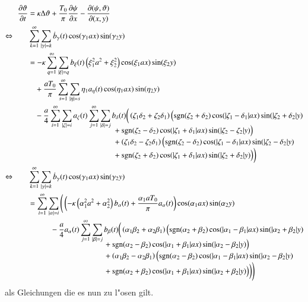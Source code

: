 \begin{align*}
\frac{\partial\vartheta}{\partial t}
&=
\kappa\Delta\vartheta
+ \frac{T_0}{\pi}\frac{\partial\psi}{\partial x}
- \frac{\partial(\psi,\vartheta)}{\partial(x,y)}
\\
\Leftrightarrow \qquad
&
\sum_{k = 1}^{\infty}
\sum_{|\gamma| = k}
\dot{b}_{\gamma}(t)
\cos(\gamma_1 ax) \sin(\gamma_2 y)
\\
&=
-
\kappa
\sum_{q = 1}^{\infty}
\sum_{|\xi| = q}
b_{\xi}(t)
\left(\xi_1^2 a^2 + \xi_2^2\right)
\cos(\xi_1 ax) \sin(\xi_2 y)
\\
&\phantom{={}}
+
\frac{a T_0}{\pi}
\sum_{s = 1}^{\infty}
\sum_{|\eta| = s}
\eta_1
a_{\eta}(t)
\cos(\eta_1 ax) \sin(\eta_2 y)
\\
&\phantom{={}}
-
\frac{a}{4}
\sum_{i = 1}^{\infty}
\sum_{|\zeta| = i}
a_{\zeta}(t)
\sum_{j = 1}^{\infty}
\sum_{|\delta| = j}
b_{\delta}(t)
\bigg(
\left(\zeta_1 \delta_2 + \zeta_2 \delta_1 \right)
\Big(
\sgn(\zeta_2 + \delta_2)
\cos(|\zeta_1 - \delta_1|ax)\sin(|\zeta_2 + \delta_2|y)
\\[-2ex]
&\phantom{=-abbb\sum\sum.....{}ccccccc}
+
\sgn(\zeta_2 - \delta_2)
\cos(|\zeta_1 + \delta_1|ax)\sin(|\zeta_2 - \zeta_2|y)
\Big)
\\[-1ex]
&\phantom{=-abbb\sum\sum.....{}ccccccc}
+
\left(\zeta_1 \delta_2 - \zeta_2 \delta_1 \right)
\Big(
\sgn(\zeta_2 - \delta_2)
\cos(|\zeta_1 - \delta_1|ax)\sin(|\zeta_2 - \delta_2|y)
\\[-1ex]
&\phantom{=-abbb\sum\sum.....{}ccccccc}
+
\sgn(\zeta_2 + \delta_2)
\cos(|\zeta_1 + \delta_1|ax)\sin(|\zeta_2 + \delta_2|y)
\Big)
\bigg)
\\
\Leftrightarrow \qquad
&
\sum_{k = 1}^{\infty}
\sum_{|\gamma| = k}
\dot{b}_{\gamma}(t)
\cos(\gamma_1 ax) \sin(\gamma_2 y)
\\
&=
\sum_{i = 1}^{\infty}
\sum_{|\alpha| = i}
\Bigg(
\left(
-
\kappa
\left(\alpha_1^2 a^2 + \alpha_2^2\right)
b_{\alpha}(t)
+
\frac{\alpha_1 a T_0}{\pi}
a_{\alpha}(t)
\right)
\cos(\alpha_1 ax) \sin(\alpha_2 y)
\\
&\phantom{={}aaaa}
-
\frac{a}{4}
a_{\alpha}(t)
\sum_{j = 1}^{\infty}
\sum_{|\beta| = j}
b_{\beta}(t)
\bigg(
\left(\alpha_1 \beta_2 + \alpha_2 \beta_1 \right)
\Big(
\sgn(\alpha_2 + \beta_2)
\cos(|\alpha_1 - \beta_1|ax)\sin(|\alpha_2 + \beta_2|y)
\\[-2ex]
&\phantom{=-aat\sum\sum...{}ccccccc}
+
\sgn(\alpha_2 - \beta_2)
\cos(|\alpha_1 + \beta_1|ax)\sin(|\alpha_2 - \beta_2|y)
\Big)
\\[-1ex]
&\phantom{=-aat\sum\sum...{}ccccccc}
+
\left(\alpha_1 \beta_2 - \alpha_2 \beta_1 \right)
\Big(
\sgn(\alpha_2 - \beta_2)
\cos(|\alpha_1 - \beta_1|ax)\sin(|\alpha_2 - \beta_2|y)
\\[-1ex]
&\phantom{=-aat\sum\sum...{}ccccccc}
+
\sgn(\alpha_2 + \beta_2)
\cos(|\alpha_1 + \beta_1|ax)\sin(|\alpha_2 + \beta_2|y)
\Big)
\bigg)
\Bigg)
\end{align*}
als Gleichungen die es nun zu l"osen gilt.


